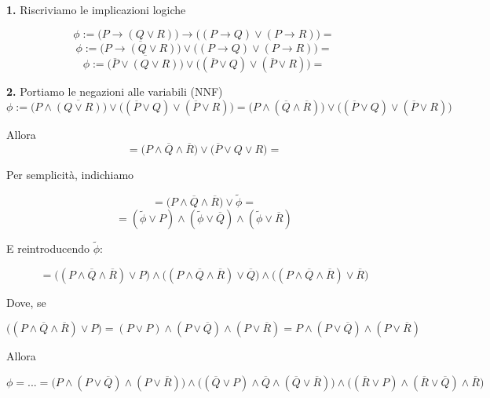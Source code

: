 \documentclass[a4paper,10pt]{article}
\begin{document}
{\begin{itemize}[label=, leftmargin=0pt]
\begin{osservazioni}
    \textbf{1.} Riscriviamo le implicazioni logiche
    
    $$\phi:= \bigg(P \rightarrow (Q\lor R)\bigg)\rightarrow \bigg( (P\rightarrow Q) \lor (P\rightarrow R) \bigg)=$$
    $$\phi:= \overline {\bigg(P \rightarrow (Q\lor R)\bigg)} \lor \bigg( (P\rightarrow Q) \lor (P\rightarrow R) \bigg)=$$
    $$\phi:= \overline {\bigg(\overline P \lor (Q\lor R)\bigg)} \lor \bigg( (\overline P\lor Q) \lor (\overline P\lor R) \bigg)=$$

    \textbf{2.} Portiamo le negazioni alle variabili (NNF)
    $$\phi:=  {\bigg( P \land \overline {(Q\lor R)}\bigg)} \lor \bigg( (\overline P\lor Q) \lor (\overline P\lor R) \bigg)={\bigg( P \land (\overline Q\land \overline R)}\bigg) \lor \bigg( (\overline P\lor Q) \lor (\overline P\lor R) \bigg)$$

    Allora 
    $$=\bigg( P \land \overline Q\land \overline R\bigg) \lor \bigg( \overline P\lor Q \lor R \bigg)=$$

    Per semplicità, indichiamo 

    $$=\bigg( P \land \overline Q\land \overline R\bigg) \lor \tilde \phi =$$
    $$=(\tilde \phi \lor P) \land (\tilde \phi \lor \overline Q) \land (\tilde \phi \lor \overline R)$$

    E reintroducendo $\tilde \phi$:

    $$=\bigg((P \land \overline Q\land \overline R) \lor P\bigg) \land \bigg((P \land \overline Q\land \overline R) \lor \overline Q\bigg) \land \bigg((P \land \overline Q\land \overline R) \lor \overline R\bigg)$$

    Dove, se

    $$\bigg((P \land \overline Q\land \overline R) \lor P\bigg)=(P\lor P) \land (P\lor \overline Q) \land (P \lor \overline R) = P \land (P\lor \overline Q) \land (P \lor \overline R)$$

    Allora 
    
    $$\phi = ... = %
    \bigg(P \land (P\lor \overline Q) \land (P \lor \overline R)\bigg) \land \bigg((\overline Q \lor P ) \land \overline Q\land (\overline Q \lor \overline R)\bigg) \land \bigg((\overline R \lor P ) \land (\overline R\lor \overline Q) \land \overline R\bigg)$$    
    

\end{osservazioni}
\end{itemize}}
\end{document}

